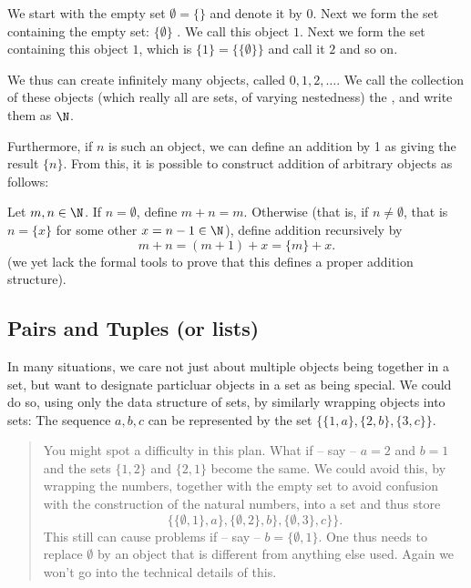 We start with the empty set $\emptyset=\{\}$ and
denote it by $0$. Next we form the set containing the empty set:
$\{\emptyset\}$ . We call this object $1$. Next we form the set containing this
object $1$, which is $\{1\}=\{\{\emptyset\}\}$ and call it $2$ and so on.

We thus can create infinitely many objects, called $0,1,2,\ldots$. We call the
collection of these objects (which really all are sets, of varying nestedness) the
, and write them as $\N$.

Furthermore, if $n$
is such an object, we can define an addition by 1 as giving the result $\{n\}$. From
this, it is possible to construct addition of arbitrary objects as follows:

Let $m,n\in\N$. If $n=\emptyset$, define $m+n=m$. Otherwise (that is, if
$n\not=\emptyset$, that is $n=\{x\}$ for some other $x=n-1\in\N$), define addition
recursively by
\[
m+n=(m+1)+x=\{m\}+x.
\]
(we yet lack the formal tools to prove that this defines a proper addition structure).

\subsection{Pairs and Tuples (or lists)}

In many situations, we care not just about multiple objects being together in a set,
but want to designate particluar objects in a set as
being special. We could do so, using only the data structure of sets, by similarly
wrapping objects into sets: The sequence $a,b,c$ can be represented by the set
$\{\{1,a\},\{2,b\},\{3,c\}\}$.

\begin{quote}
\bonussection
You might spot a difficulty in this plan. What if -- say -- $a=2$ and $b=1$ and the
sets $\{1,2\}$ and $\{2,1\}$ become the same. We could avoid this, by wrapping the
numbers, together with the empty set to avoid confusion with the construction of the
natural numbers, into a set and thus store
\[
\{\{\emptyset,1\},a\},\{\emptyset,2\},b\},\{\emptyset,3\},c\}\}.
\]
This still can cause problems if -- say -- $b=\{\emptyset,1\}$. One thus needs to
replace $\emptyset$ by an object that is different from anything else used. Again we
won't go into the technical details of this.
\end{quote}

